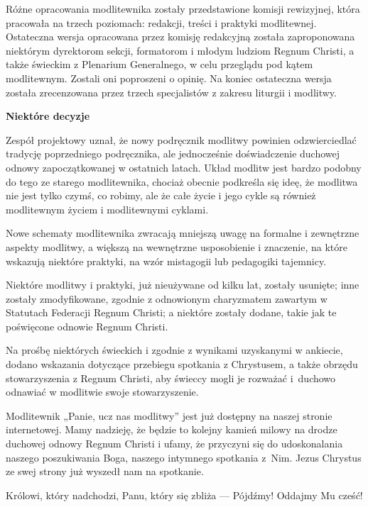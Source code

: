 ﻿\documentclass[9pt,twoside]{extarticle}
\newcommand{\ltrhdr}[1]{{\par\noindent\bf #1\par}}
\begin{document}
Różne opracowania modlitewnika zostały przedstawione komisji rewizyjnej, która pracowała na trzech poziomach: redakcji, treści i praktyki modlitewnej. Ostateczna wersja opracowana przez komisję redakcyjną została zaproponowana niektórym dyrektorom sekcji, formatorom i młodym ludziom Regnum Christi, a także świeckim z Plenarium Generalnego, w celu przeglądu pod kątem modlitewnym. Zostali oni poproszeni o opinię. Na koniec ostateczna wersja została zrecenzowana przez trzech specjalistów z zakresu liturgii i modlitwy.


\ltrhdr{Niektóre decyzje}


Zespół projektowy uznał, że nowy podręcznik modlitwy powinien odzwierciedlać tradycję poprzedniego podręcznika, ale jednocześnie doświadczenie duchowej odnowy zapoczątkowanej w ostatnich latach. Układ modlitw jest bardzo podobny do tego ze starego modlitewnika, chociaż obecnie podkreśla się ideę, że modlitwa nie jest tylko czymś, co robimy, ale że całe życie i jego cykle są również modlitewnym życiem i modlitewnymi cyklami.


Nowe schematy modlitewnika zwracają mniejszą uwagę na formalne i zewnętrzne aspekty modlitwy, a większą na wewnętrzne usposobienie i znaczenie, na które wskazują niektóre praktyki, na wzór mistagogii lub pedagogiki tajemnicy.


Niektóre modlitwy i praktyki, już nieużywane od kilku lat, zostały usunięte; inne zostały zmodyfikowane, zgodnie z odnowionym charyzmatem zawartym w Statutach Federacji Regnum Christi; a niektóre zostały dodane, takie jak te poświęcone odnowie Regnum Christi.


Na prośbę niektórych świeckich i zgodnie z wynikami uzyskanymi w ankiecie, dodano wskazania dotyczące przebiegu spotkania z Chrystusem, a także obrzędu stowarzyszenia z Regnum Christi, aby świeccy mogli je rozważać i~duchowo odnawiać w modlitwie swoje stowarzyszenie.


Modlitewnik „Panie, ucz nas modlitwy” jest już dostępny na naszej stronie internetowej. Mamy nadzieję, że będzie to kolejny kamień milowy na drodze duchowej odnowy Regnum Christi i ufamy, że przyczyni się do udoskonalania naszego poszukiwania Boga, naszego intymnego spotkania z~Nim. Jezus Chrystus ze swej strony już wyszedł nam na spotkanie.


Królowi, który nadchodzi, Panu, który się zbliża --- Pójdźmy! Oddajmy Mu cześć!


\vspace{1cm}
\end{document}
